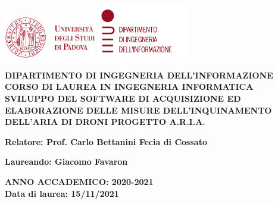 \begin{titlepage}
  \begin{center}
    \includegraphics[width=0.3\textwidth]{images/unipd.png}
    \hfill
    \includegraphics[width=0.3\textwidth]{images/dei.png}
  \end{center}
  \begin{center}
    \vspace{3cm}
    \large
    \MakeUppercase{
      \textbf{
        Dipartimento di ingegneria dell'informazione\\
        \vspace{0.5cm}
        Corso di laurea in Ingegneria Informatica\\
      }
    }
    \vspace{4cm}
    \MakeUppercase{
      \textbf{
        Sviluppo del software di acquisizione ed elaborazione delle misure dell'inquinamento dell'aria di droni progetto A.R.I.A.\\
      }
    }
    \vspace{4cm}
    \begin{flushleft}
      \textbf{
        Relatore: Prof. Carlo Bettanini Fecia di Cossato\\
      }
    \end{flushleft}
    \vspace{1cm}
    \begin{flushright}
      \textbf{
        Laureando: Giacomo Favaron\\
      }
    \end{flushright}
    \vspace{2.5cm}
    \MakeUppercase{
      \textbf{
        Anno accademico: 2020-2021\\
      }
    }
    \vspace{0.5cm}
    \textbf{
      Data di laurea: 15/11/2021
    }
  \end{center}
\end{titlepage}